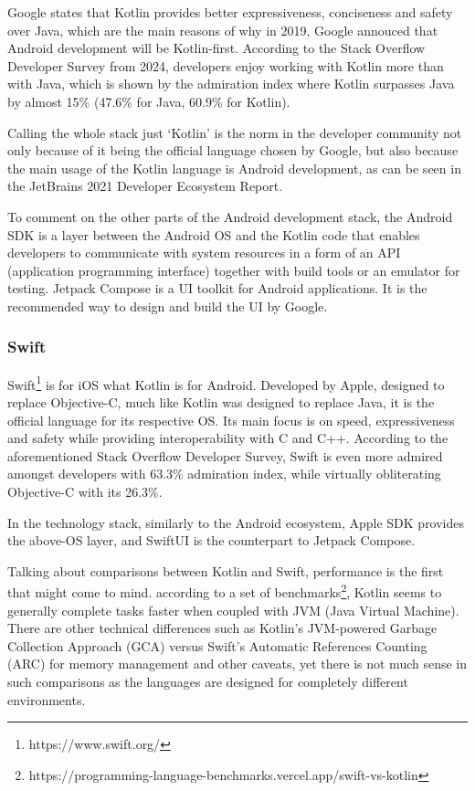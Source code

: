 \documentclass[
  digital,     %
  color,       %
  oneside,     %
  nosansbold,  %
  nocolorbold, %
  lof,         %
  lot,         %
]{fithesis4}
\begin{document}
Google states that Kotlin provides better expressiveness, conciseness and safety over Java, which are the main reasons of why in 2019, Google annouced that Android development will be Kotlin-first\cite{KotlinFirst}. According to the Stack Overflow Developer Survey from 2024\cite{StackOverflow2024}, developers enjoy working with Kotlin more than with Java, which is shown by the admiration index where Kotlin surpasses Java by almost 15\% (47.6\% for Java, 60.9\% for Kotlin).

Calling the whole stack just `Kotlin' is the norm in the developer community not only because of it being the official language chosen by Google, but also because the main usage of the Kotlin language is Android development, as can be seen in the JetBrains 2021 Developer Ecosystem Report\cite{jetbrainsSurvey}.

To comment on the other parts of the Android development stack, the Android SDK is a layer between the Android OS and the Kotlin code that enables developers to communicate with system resources in a form of an API (application programming interface) together with build tools or an emulator for testing. Jetpack Compose is a UI toolkit for Android applications. It is the recommended way to design and build the UI by Google\cite{JetpackCompose}.

\subsubsection{Swift}
Swift\footnote{https://www.swift.org/} is for iOS what Kotlin is for Android. Developed by Apple, designed to replace Objective-C, much like Kotlin was designed to replace Java, it is the official language for its respective OS. Its main focus is on speed, expressiveness and safety while providing interoperability with C and C++.
According to the aforementioned Stack Overflow Developer Survey\cite{StackOverflow2024}, Swift is even more admired amongst developers with 63.3\% admiration index, while virtually obliterating Objective-C with its 26.3\%.

In the technology stack, similarly to the Android ecosystem, Apple SDK provides the above-OS layer, and SwiftUI is the counterpart to Jetpack Compose. 

Talking about comparisons between Kotlin and Swift, performance is the first that might come to mind. according to a set of benchmarks\footnote{https://programming-language-benchmarks.vercel.app/swift-vs-kotlin}, Kotlin seems to generally complete tasks faster when coupled with JVM (Java Virtual Machine). There are other technical differences such as Kotlin's JVM-powered Garbage Collection Approach (GCA) versus Swift's Automatic References Counting (ARC) for memory management\cite{KotlinSwift} and other caveats, yet there is not much sense in such comparisons as the languages are designed for completely different environments. 
\end{document}
